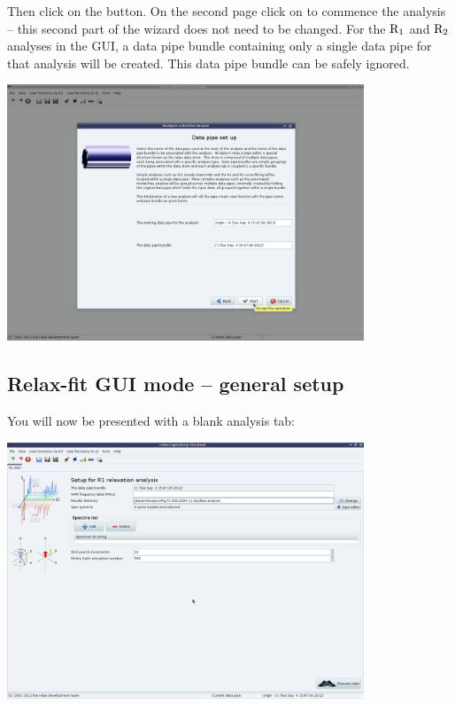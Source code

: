 Then click on the  button.  On the second page click on  to commence the analysis -- this second part of the wizard does not need to be changed.  For the $\mathrm{R}_1$ and $\mathrm{R}_2$ analyses in the GUI, a data pipe bundle containing only a single data pipe for that analysis will be created.  This data pipe bundle can be safely ignored.

\begin{minipage}[h]{\linewidth}
\centerline{\includegraphics[width=0.8\textwidth, bb=14 14 1415 1019]{graphics/screenshots/r1_analysis/analysis_wizard2}}
\end{minipage}



\subsection{Relax-fit GUI mode -- general setup}

You will now be presented with a blank analysis tab:

\begin{minipage}[h]{\linewidth}
\centerline{\includegraphics[width=0.8\textwidth, bb=14 14 1415 1019]{graphics/screenshots/r1_analysis/blank}}
\end{minipage}

